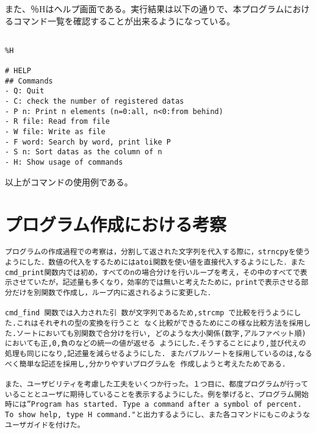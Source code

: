 \documentclass[a4j]{jarticle}
\begin{document}
\begin{enumerate}
{\begin{verbatim}
\end{verbatim}
}

また、％Hはヘルプ画面である。実行結果は以下の通りで、本プログラムにおけるコマンド一覧を確認することが出来るようになっている。

{\baselineskip 3mm
\begin{verbatim}

%H

# HELP
## Commands
- Q: Quit
- C: check the number of registered datas
- P n: Print n elements (n=0:all, n<0:from behind)
- R file: Read from file
- W file: Write as file
- F word: Search by word, print like P
- S n: Sort datas as the column of n
- H: Show usage of commands

\end{verbatim}
}

以上がコマンドの使用例である。


%
%

\section{プログラム作成における考察}

\begin{verbatim}
プログラムの作成過程での考察は，分割して返された文字列を代入する際に，strncpyを使うようにした．数値の代入をするためにはatoi関数を使い値を直接代入するようにした．またcmd_print関数内では初め，すべてのnの場合分けを行いループを考え，その中のすべてで表示させていたが，記述量も多くなり，効率的では無いと考えたために，printで表示させる部分だけを別関数で作成し，ループ内に返されるように変更した．

cmd_find 関数では入力された引 数が文字列であるため,strcmp で比較を行うようにした.これはそれぞれの型の変換を行うこと なく比較ができるためにこの様な比較方法を採用した.ソートにおいても別関数で合分けを行い, どのような大小関係(数字,アルファベット順)においても正,0,負のなどの統一の値が返せる ようにした.そうすることにより,並び代えの処理も同じになり,記述量を減らせるようにした. またバブルソートを採用しているのは,なるべく簡単な記述を採用し,分かりやすいプログラムを 作成しようと考えたためである.

また、ユーザビリティを考慮した工夫をいくつか行った。１つ目に、都度プログラムが行っていることとユーザに期待していることを表示するようにした。例を挙げると、プログラム開始時には”Program has started. Type a command after a symbol of percent. To show help, type H command."と出力するようにし、また各コマンドにもこのようなユーザガイドを付けた。


\end{verbatim}
\end{enumerate}
\end{document}
